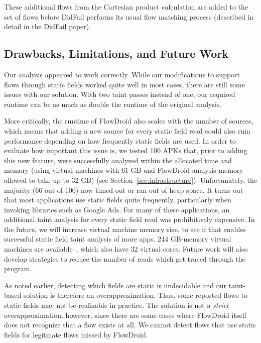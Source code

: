 These additional flows from the Cartesian product calculation are added to the set of flows before DidFail performs its usual flow matching process (described in detail in the DidFail paper).

\subsection{Drawbacks, Limitations, and Future Work}

Our analysis appeared to work correctly. While our modifications to support flows through static fields worked quite well in most cases, there are still some issues with our solution. With two taint passes instead of one, our required runtime can be as much as double the runtime of the original analysis. 

More critically, the runtime of FlowDroid also scales with the number of sources, which means that adding a new source for every static field read could also ruin performance depending on how frequently static fields are used. In order to evaluate how important this issue is, we tested 100 APKs that, prior to adding this new feature, were successfully analyzed within the allocated time and memory (using virtual machines with 61 GB and FlowDroid analysis memory allowed to take up to 32 GB) (see Section~\ref{sec:infrastructure}). Unfortunately, the majority (66 out of 100) now timed out or ran out of heap space. It turns out that most applications use static fields quite frequently, particularly when invoking libraries such as Google Ads. For many of these applications, an additional taint analysis for every static field read was prohibitively expensive. In the future, we will increase virtual machine memory size, to see if that enables successful static field taint analysis of more apps. 244 GB-memory virtual machines are available~\cite{amazon}, which also have 32 virtual cores. Future work will also develop strategies to reduce the number of reads which get traced through the program. 

As noted earlier, detecting which fields are static is undecidable and our taint-based solution is therefore an overapproximation. Thus, some reported flows to static fields may not be realizable in practice. The solution is not a \emph{strict} overapproximation, however, since there are some cases where FlowDroid itself does not recognize that a flow exists at all. We cannot detect flows that use static fields for legitmate flows missed by FlowDroid. 

